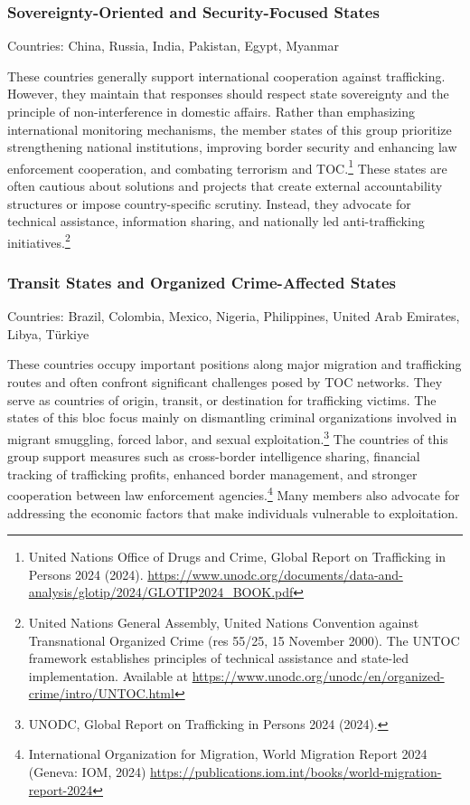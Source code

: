 \subsubsection{Sovereignty-Oriented and Security-Focused States}

Countries: China, Russia, India, Pakistan, Egypt, Myanmar

These countries generally support international cooperation against trafficking. However, they maintain that responses should respect state sovereignty and the principle of non-interference in domestic affairs. Rather than emphasizing international monitoring mechanisms, the member states of this group prioritize strengthening national institutions, improving border security and enhancing law enforcement cooperation, and combating terrorism and TOC.\footnote{United Nations Office of Drugs and Crime, Global Report on Trafficking in Persons 2024 (2024). \url{https://www.unodc.org/documents/data-and-analysis/glotip/2024/GLOTIP2024_BOOK.pdf}} These states are often cautious about solutions and projects that create external accountability structures or impose country-specific scrutiny. Instead, they advocate for technical assistance, information sharing, and nationally led anti-trafficking initiatives.\footnote{United Nations General Assembly, United Nations Convention against Transnational Organized Crime (res 55/25, 15 November 2000). The UNTOC framework establishes principles of technical assistance and state-led implementation. Available at \url{https://www.unodc.org/unodc/en/organized-crime/intro/UNTOC.html}}

\subsubsection{Transit States and Organized Crime-Affected States}

Countries: Brazil, Colombia, Mexico, Nigeria, Philippines, United Arab Emirates, Libya, Türkiye

These countries occupy important positions along major migration and trafficking routes and often confront significant challenges posed by TOC networks. They serve as countries of origin, transit, or destination for trafficking victims. The states of this bloc focus mainly on dismantling criminal organizations involved in migrant smuggling, forced labor, and sexual exploitation.\footnote{UNODC, Global Report on Trafficking in Persons 2024 (2024).} The countries of this group support measures such as cross-border intelligence sharing, financial tracking of trafficking profits, enhanced border management, and stronger cooperation between law enforcement agencies.\footnote{International Organization for Migration, World Migration Report 2024 (Geneva: IOM, 2024) \url{https://publications.iom.int/books/world-migration-report-2024}} Many members also advocate for addressing the economic factors that make individuals vulnerable to exploitation.

